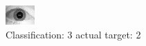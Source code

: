 \begin{figure}[h!]
\begin{center}
\includegraphics[width=0.60\columnwidth]{figures/ID1614_class_3_target_2.png}
\end{center}
\caption{ Classification: 3 actual target: 2}
\label{fig:ID1614_class_3_target_2}
\end{figure}
